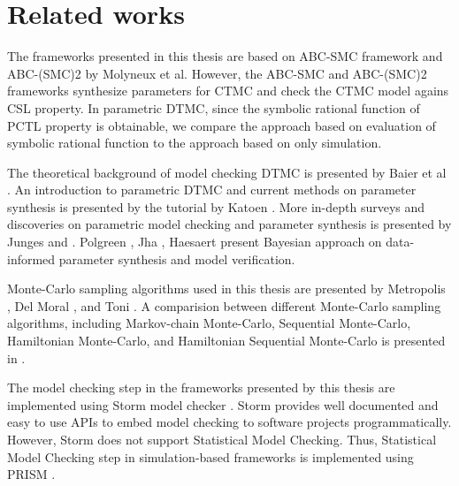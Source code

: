 \chapter{Related works}
The frameworks presented in this thesis are based on ABC-SMC framework \cite{molyneux2019bayesian}
and ABC-(SMC)2 \cite{molyneux2020abc} by Molyneux et al. However, the ABC-SMC and ABC-(SMC)2
frameworks synthesize parameters for CTMC and check the CTMC model agains CSL property. In
parametric DTMC, since the symbolic rational function of PCTL property is obtainable, we compare the
approach based on evaluation of symbolic rational function to the approach based on only simulation.

The theoretical background of model checking DTMC is presented by Baier et al
\cite{baier2008principles}. An introduction to parametric DTMC and current methods on parameter
synthesis is presented by the tutorial by Katoen \cite{katoen2016probabilistic}. More in-depth
surveys and discoveries on parametric model checking and parameter synthesis is presented by Junges
\cite{junges2020parameter} and \cite{hutschenreiter2017parametric}. Polgreen
\cite{polgreen2016data}, Jha \cite{jha2009bayesian}, Haesaert \cite{haesaert2015data} present
Bayesian approach on data-informed parameter synthesis and model verification.

Monte-Carlo sampling algorithms used in this thesis are presented by Metropolis
\cite{metropolis1953equation}, Del Moral \cite{del2006sequential}, and Toni
\cite{toni2009approximate}. A comparision between different Monte-Carlo sampling algorithms,
including Markov-chain Monte-Carlo, Sequential Monte-Carlo, Hamiltonian Monte-Carlo, and Hamiltonian
Sequential Monte-Carlo is presented in \cite{daviet2018inference}.

The model checking step in the frameworks presented by this thesis are implemented using Storm model
checker \cite{hensel2020probabilistic}. Storm provides well documented and easy to use APIs to embed
model checking to software projects programmatically. However, Storm does not support Statistical
Model Checking. Thus, Statistical Model Checking step in simulation-based frameworks is implemented
using PRISM \cite{kwiatkowska2011prism}.